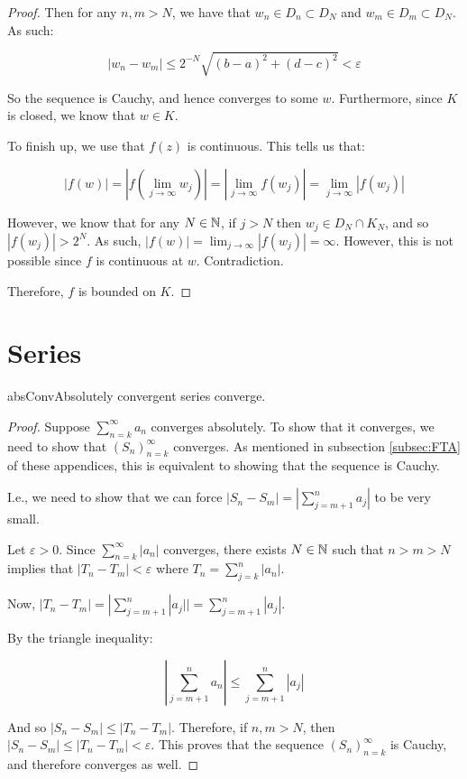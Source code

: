\begin{proof}
Then for any $n,m > N$, we have that $w_n \in D_n \subset D_N$ and $w_m\in D_m \subset D_N$. As such:

$$|w_n - w_m| \le  2^{-N}\sqrt{(b-a)^2 + (d-c)^2} < \varepsilon$$

So the sequence is Cauchy, and hence converges to some $w$. Furthermore, since $K$ is closed, we know that $w\in K$.

To finish up, we use that $f(z)$ is continuous. This tells us that:

$$|f(w)| = |f(\lim_{j\rightarrow \infty} w_j)| = |\lim_{j\rightarrow \infty} f(w_j)| = \lim_{j\rightarrow \infty} |f(w_j)|$$

However, we know that for any $N \in \mathbb{N}$, if $j > N$ then $w_j\in D_N \cap K_N$, and so $|f(w_j)| > 2^N$. As such, $|f(w)| = \lim_{j\rightarrow \infty} |f(w_j)| = \infty$. However, this is not possible since $f$ is continuous at $w$. Contradiction.

Therefore, $f$ is bounded on $K$.

\end{proof}


\section{Series}

\begin{thmbo}{}{absConv}Absolutely convergent series converge.\end{thmbo}

\begin{proof} Suppose $\sum_{n = k}^\infty a_n$ converges absolutely. To show that it converges, we need to show that $(S_n)_{n=k}^\infty$ converges. As mentioned in subsection \ref{subsec:FTA} of these appendices, this is equivalent to showing that the sequence is Cauchy.

I.e., we need to show that we can force $|S_n - S_m| = |\sum_{j = m+1}^n a_j|$ to be very small.

Let $\varepsilon > 0$. Since $\sum_{n = k}^\infty |a_n|$ converges, there exists $N\in \mathbb{N}$ such that $n > m > N$ implies that $|T_n - T_m| < \varepsilon$ where $T_n = \sum_{j = k}^n |a_n|$.

Now, $|T_n - T_m| = |\sum_{j = m+1}^n |a_j|| = \sum_{j = m+1}^n |a_j|$.

By the triangle inequality:

$$|\sum_{j = m+1}^n a_n| \le \sum_{j = m+1}^n |a_j|$$

And so $|S_n - S_m| \le |T_n - T_m|$. Therefore, if $n,m > N$, then $|S_n - S_m| \le |T_n - T_m| < \varepsilon$. This proves that the sequence $(S_n)_{n=k}^\infty$ is Cauchy, and therefore converges as well.
\end{proof}

